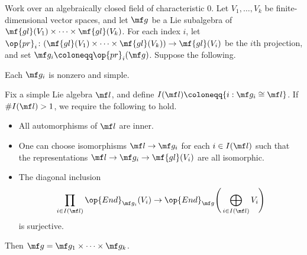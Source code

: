 \documentclass[../thesis.tex]{subfiles}
\begin{document}
\begin{lemma} \label{lem:mz-product}
	Work over an algebraically closed field of characteristic $0$. Let $V_1,\ldots,V_k$ be finite-dimensional vector spaces, and let $\mf g$ be a Lie subalgebra of $\mf{gl}(V_1)\times\cdots\times\mf{gl}(V_k)$. For each index $i$, let $\op{pr}_i\colon(\mf{gl}(V_1)\times\cdots\times\mf{gl}(V_k))\to\mf{gl}(V_i)$ be the $i$th projection, and set $\mf g_i\coloneqq\op{pr}_i(\mf g)$. Suppose the following.
	\begin{listroman}
		\item Each $\mf g_i$ is nonzero and simple.
		\item Fix a simple Lie algebra $\mf l$, and define $I(\mf l)\coloneqq\{i:\mf g_i\cong\mf l\}$. If $\#I(\mf l)>1$, we require the following to hold.
		\begin{itemize}
			\item All automorphisms of $\mf l$ are inner.
			\item One can choose isomorphisms $\mf l\to\mf g_i$ for each $i\in I(\mf l)$ such that the representations $\mf l\to\mf g_i\to\mf{gl}(V_i)$ are all isomorphic.
			\item The diagonal inclusion
			\[\prod_{i\in I(\mf l)}\op{End}_{\mf g_i}(V_i)\to\op{End}_{\mf g}\Bigg(\bigoplus_{i\in I(\mf l)}V_i\Bigg)\]
			is surjective.
		\end{itemize}
	\end{listroman}
	Then $\mf g=\mf g_1\times\cdots\times\mf g_k$.
\end{lemma}
\end{document}
